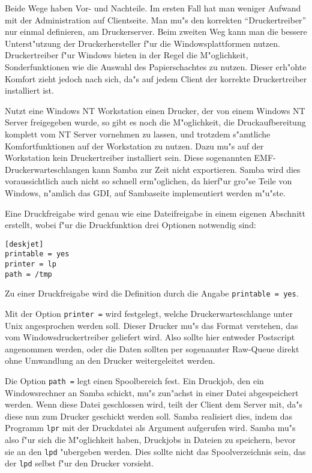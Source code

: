 \documentclass{scrartcl}
\newcommand{\prog}{\texttt}
\newcommand{\param}{\texttt}
\begin{document}
Beide Wege haben Vor- und Nachteile. Im ersten Fall hat man weniger
Aufwand mit der Administration auf Clientseite. Man mu"s den korrekten
"`Druckertreiber"' nur einmal definieren, am Druckerserver.  Beim
zweiten Weg kann man die bessere Unterst"utzung der Druckerhersteller
f"ur die Windowsplattformen nutzen. Druckertreiber f"ur Windows bieten
in der Regel die M"oglichkeit, Sonderfunktionen wie die Auswahl des
Papierschachtes zu nutzen. Dieser erh"ohte Komfort zieht jedoch nach
sich, da"s auf jedem Client der korrekte Druckertreiber installiert
ist.

Nutzt eine Windows NT Workstation einen Drucker, der von einem Windows
NT Server freigegeben wurde, so gibt es noch die M"oglichkeit, die
Druckaufbereitung komplett vom NT Server vornehmen zu lassen, und
trotzdem s"amtliche Komfortfunktionen auf der Workstation zu nutzen.
Dazu mu"s auf der Workstation kein Druckertreiber installiert sein.
Diese sogenannten EMF-Druckerwarteschlangen kann Samba zur Zeit nicht
exportieren. Samba wird dies voraussichtlich auch nicht so schnell
erm"oglichen, da hierf"ur gro"se Teile von Windows, n"amlich das GDI,
auf Sambaseite implementiert werden m"u"ste.

Eine Druckfreigabe wird genau wie eine Dateifreigabe in einem eigenen
Abschnitt erstellt, wobei f"ur die Druckfunktion drei Optionen
notwendig sind:

\begin{verbatim}
[deskjet]
printable = yes
printer = lp
path = /tmp
\end{verbatim}

Zu einer Druckfreigabe wird die Definition durch die Angabe
\param{printable = yes}.

Mit der Option \param{printer =} wird festgelegt, welche
Druckerwarteschlange unter Unix angesprochen werden soll. Dieser
Drucker mu"s das Format verstehen, das vom Windowsdruckertreiber
geliefert wird. Also sollte hier entweder Postscript angenommen
werden, oder die Daten sollten per sogenannter Raw-Queue direkt ohne
Umwandlung an den Drucker weitergeleitet werden.

Die Option \param{path =} legt einen Spoolbereich fest. Ein Druckjob,
den ein Windowsrechner an Samba schickt, mu"s zun"achst in einer Datei
abgespeichert werden. Wenn diese Datei geschlossen wird, teilt der
Client dem Server mit, da"s diese nun zum Drucker geschickt werden
soll. Samba realisiert dies, indem das Programm \prog{lpr} mit der
Druckdatei als Argument aufgerufen wird. Samba mu"s also f"ur sich die
M"oglichkeit haben, Druckjobs in Dateien zu speichern, bevor sie an
den \prog{lpd} "ubergeben werden. Dies sollte nicht das
Spoolverzeichnis sein, das der \prog{lpd} selbst f"ur den Drucker
vorsieht.
\end{document}
